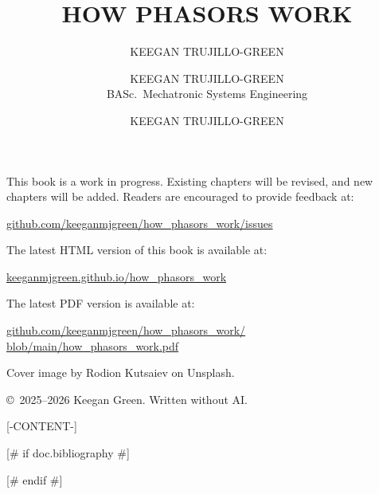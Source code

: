 \documentclass[oneside]{book}
\title{HOW PHASORS WORK}
\author{KEEGAN TRUJILLO-GREEN}
\begin{document}


\newpage \thispagestyle{empty}

\begin{titlepage}
  \author{KEEGAN TRUJILLO-GREEN \\ BASc.\ Mechatronic Systems Engineering}
  \date{}
  \maketitle
  \author{KEEGAN TRUJILLO-GREEN}
\end{titlepage}

\thispagestyle{empty}

This book is a work in progress. Existing chapters will be revised, and new chapters will be added. Readers are encouraged to provide feedback at:

\href{https://github.com/keeganmjgreen/how_phasors_work/issues}{github.com/keeganmjgreen/how\_phasors\_work/issues}

The latest HTML version of this book is available at:

\href{https://keeganmjgreen.github.io/how_phasors_work}{keeganmjgreen.github.io/how\_phasors\_work}

The latest PDF version is available at:

\href{https://raw.githubusercontent.com/keeganmjgreen/how_phasors_work/refs/heads/main/how_phasors_work.pdf}{github.com/keeganmjgreen/how\_phasors\_work/} \\ \href{https://raw.githubusercontent.com/keeganmjgreen/how_phasors_work/refs/heads/main/how_phasors_work.pdf}{blob/main/how\_phasors\_work.pdf}

Cover image by Rodion Kutsaiev on Unsplash.

\copyright \ 2025--2026 Keegan Green. Written without AI.

\newpage

\tableofcontents

\newpage

[-CONTENT-]

[# if doc.bibliography #]
\begin{flushleft}

\end{flushleft}
[# endif #]


\end{document}
